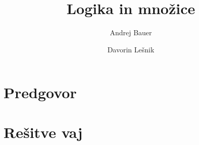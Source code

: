 \documentclass[11pt,a4paper,twoside]{book}
\def\OPTtitle{Logika in množice}
\begin{document}

\title{\OPTtitle\\\texttt{\OPTversion}}
\author{Andrej Bauer \and Davorin Lešnik}
\maketitle


\chapter*{Predgovor}%


\tableofcontents






\ifOPTincludeall











\chapter{Rešitve vaj}

\appendix

\else
\fi
\end{document}

